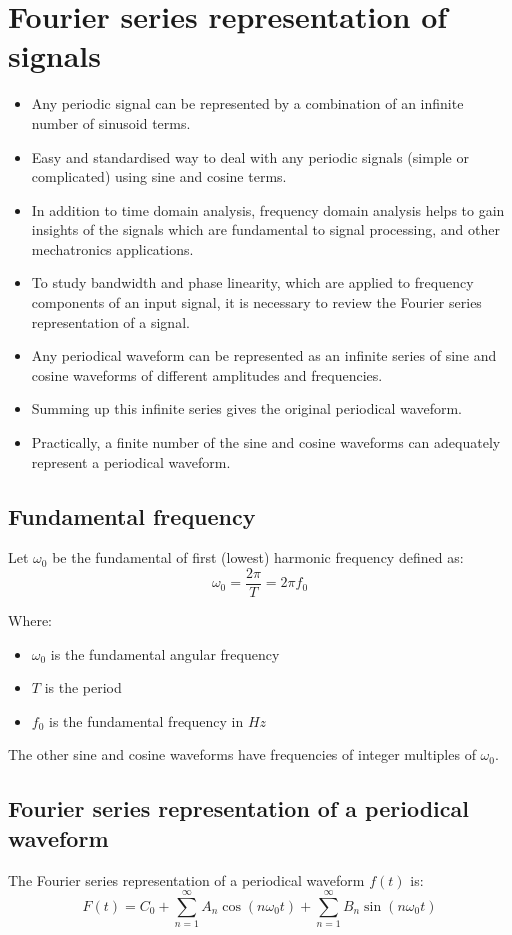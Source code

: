 \documentclass[11pt]{article}
\begin{document}
\section{Fourier series representation of signals}
\label{sec:org0a13483}
\begin{itemize}
\item Any periodic signal can be represented by a combination of an infinite number of sinusoid terms.
\item Easy and standardised way to deal with any periodic signals (simple or complicated) using sine and cosine terms.
\item In addition to time domain analysis, frequency domain analysis helps to gain insights of the signals which are fundamental to signal processing, and other mechatronics applications.
\item To study bandwidth and phase linearity, which are applied to frequency components of an input signal, it is necessary to review the Fourier series representation of a signal.
\item Any periodical waveform can be represented as an infinite series of sine and cosine waveforms of different amplitudes and frequencies.
\item Summing up this infinite series gives the original periodical waveform.
\item Practically, a finite number of the sine and cosine waveforms can adequately represent a periodical waveform.
\end{itemize}
\subsection{Fundamental frequency}
\label{sec:orgeeed551}
Let \(\omega_0\) be the fundamental of first (lowest) harmonic frequency defined as:
\[\omega_0 = \frac{2\pi}{T} = 2 \pi f_0\]

Where:
\begin{itemize}
\item \(\omega_0\) is the fundamental angular frequency
\item \(T\) is the period
\item \(f_0\) is the fundamental frequency in \(\unit{Hz}\)
\end{itemize}

The other sine and cosine waveforms have frequencies of integer multiples of \(\omega_0\).

 \newpage
\subsection{Fourier series representation of a periodical waveform}
\label{sec:orga0fcf3c}
The Fourier series representation of a periodical waveform \(f(t)\) is:
\[F(t) = C_0 + \sum_{n = 1}^{\infty} A_n \cos (n \omega_0 t) + \sum_{n = 1}^{\infty} B_n \sin (n \omega_0 t)\]
\end{document}
